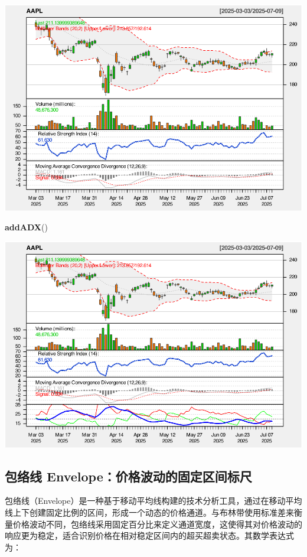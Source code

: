 \documentclass[]{ctexbook}
\newenvironment{Shaded}{\begin{snugshade}}{\end{snugshade}}
\newcommand{\FunctionTok}[1]{\textcolor[rgb]{0.13,0.29,0.53}{\textbf{#1}}}
\newcommand{\NormalTok}[1]{#1}
\begin{document}
\includegraphics[width=0.9\linewidth]{quantmod_files/figure-latex/bb_2-4}

\begin{Shaded}
\begin{Highlighting}[]
\FunctionTok{addADX}\NormalTok{()}
\end{Highlighting}
\end{Shaded}

\includegraphics[width=0.9\linewidth]{quantmod_files/figure-latex/bb_2-5}

\subsection{包络线 Envelope：价格波动的固定区间标尺}\label{ux5305ux7edcux7ebf-envelopeux4ef7ux683cux6ce2ux52a8ux7684ux56faux5b9aux533aux95f4ux6807ux5c3a}

包络线（Envelope）是一种基于移动平均线构建的技术分析工具，通过在移动平均线上下创建固定比例的区间，形成一个动态的价格通道。与布林带使用标准差来衡量价格波动不同，包络线采用固定百分比来定义通道宽度，这使得其对价格波动的响应更为稳定，适合识别价格在相对稳定区间内的超买超卖状态。其数学表达式为：
\end{document}
